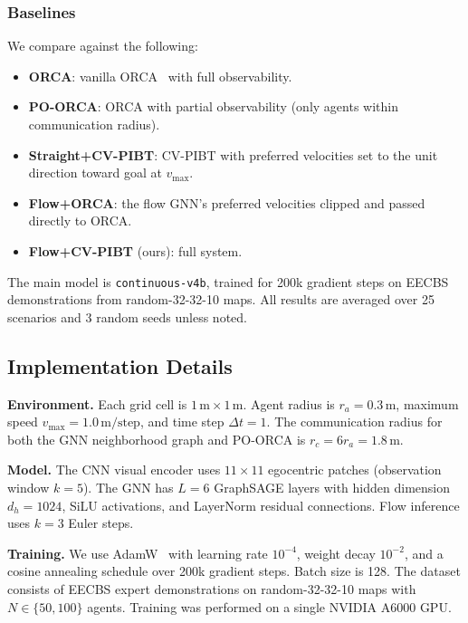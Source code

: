 \subsubsection{Baselines}

We compare against the following:
\begin{itemize}
  \item \textbf{ORCA}: vanilla ORCA~\cite{vandenberg2011orca} with full observability.
  \item \textbf{PO-ORCA}: ORCA with partial observability (only agents within communication radius).
  \item \textbf{Straight+CV-PIBT}: CV-PIBT with preferred velocities set to the unit direction toward goal at $v_{\max}$.
  \item \textbf{Flow+ORCA}: the flow GNN's preferred velocities clipped and passed directly to ORCA.
  \item \textbf{Flow+CV-PIBT} (ours): full system.
\end{itemize}

The main model is \texttt{continuous-v4b}, trained for 200k gradient steps on EECBS demonstrations from random-32-32-10 maps. All results are averaged over 25 scenarios and 3 random seeds unless noted.

\subsection{Implementation Details}

\textbf{Environment.} Each grid cell is $1\,\text{m} \times 1\,\text{m}$. Agent radius is $r_a{=}0.3\,\text{m}$, maximum speed $v_{\max}{=}1.0\,\text{m/step}$, and time step $\Delta t{=}1$. The communication radius for both the GNN neighborhood graph and PO-ORCA is $r_c{=}6r_a{=}1.8\,\text{m}$.

\textbf{Model.} The CNN visual encoder uses $11{\times}11$ egocentric patches (observation window $k{=}5$). The GNN has $L{=}6$ GraphSAGE layers with hidden dimension $d_h{=}1024$, SiLU activations, and LayerNorm residual connections. Flow inference uses $k{=}3$ Euler steps.

\textbf{Training.} We use AdamW~\cite{loshchilov2019adamw} with learning rate $10^{-4}$, weight decay $10^{-2}$, and a cosine annealing schedule over 200k gradient steps. Batch size is 128. The dataset consists of EECBS expert demonstrations on random-32-32-10 maps with $N \in \{50, 100\}$ agents. Training was performed on a single NVIDIA A6000 GPU.

